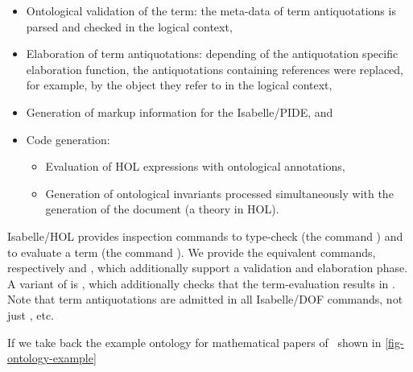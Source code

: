 \begin{isabellebody}
\begin{isamarkuptext}
\begin{itemize}
\item Ontological validation of the term: the meta-data of term antiquotations is 
parsed and checked in the logical context,

\item Elaboration of term antiquotations: depending of the antiquotation specific
elaboration function, the antiquotations containing references were replaced,
for example, by the object they refer to in the logical context,

\item Generation of markup information for the Isabelle/PIDE, and

\item Code generation:

%
\begin{itemize}%
\item Evaluation of HOL expressions with ontological annotations,

\item Generation of ontological invariants processed simultaneously
with the generation of the document (a theory in HOL).%
\end{itemize}%
\end{itemize}

Isabelle/HOL provides inspection commands to type-check (the command )
and to evaluate a term (the command ).
We provide the equivalent commands, respectively  and , which 
additionally support a validation and elaboration phase.
A variant of   is  , which additionally checks
that the term-evaluation results in .
Note that term antiquotations are admitted in all Isabelle/DOF commands, not just
,  etc. 
\end{isamarkuptext}\isamarkuptrue%

\begin{isamarkuptext}
If we take back the example ontology for mathematical papers
  of~\cite{brucker.ea:isabelledof:2019} shown in \autoref{fig-ontology-example}
\begin{figure}

\begin{isarbox}


\end{isarbox}
\end{figure}
\end{isamarkuptext}
\end{isabellebody}
